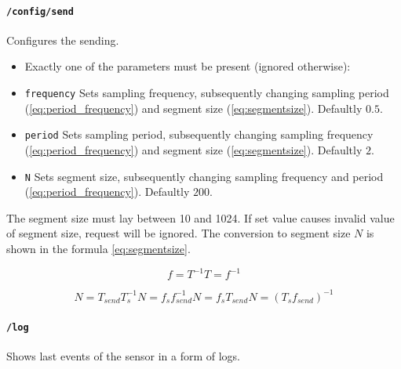 \paragraph{\texttt{/config/send}}
Configures the sending.
\begin{itemize}
    \item[] Exactly one of the parameters must be present (ignored otherwise):
    \item[] \texttt{frequency} Sets sampling frequency, subsequently changing sampling period (\ref{eq:period_frequency}) and segment size (\ref{eq:segmentsize}). Defaultly $0.5$.
    \item[] \texttt{period}    Sets sampling period, subsequently changing sampling frequency (\ref{eq:period_frequency}) and segment size (\ref{eq:segmentsize}). Defaultly $2$.
    \item[] \texttt{N}         Sets segment size, subsequently changing sampling frequency and period (\ref{eq:period_frequency}). Defaultly $200$.
\end{itemize}

The segment size must lay between 10 and 1024. If set value causes invalid value of segment size,
request will be ignored. The conversion to segment size $N$ is shown in the formula \ref{eq:segmentsize}.

\begin{subequations}
\begin{equation}
f = T^{-1}
\end{equation}
\begin{equation}
T = f^{-1}
\end{equation}
\label{eq:period_frequency}
\end{subequations}

\begin{subequations}
\begin{equation}
N = T_{send}T_s^{-1}
\end{equation}
\begin{equation}
N = f_sf_{send}^{-1}
\end{equation}
\begin{equation}
N = f_sT_{send}
\end{equation}
\begin{equation}
N = (T_sf_{send})^{-1}
\end{equation}
\label{eq:segmentsize}
\end{subequations}


\paragraph{\texttt{/log}}

Shows last events of the sensor in a form of logs.





